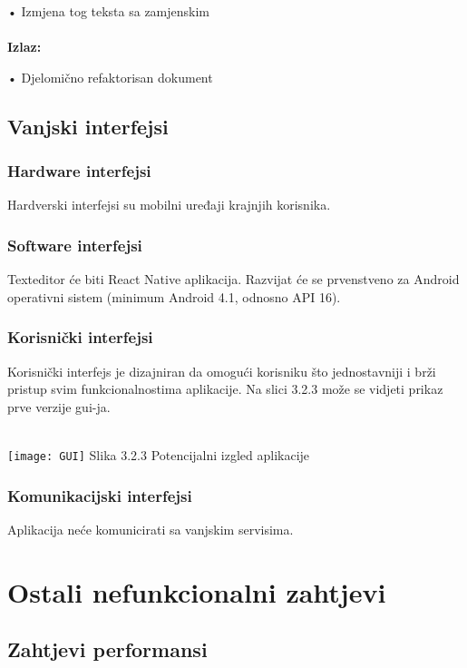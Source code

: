 \documentclass[12pt]{article}
\begin{document}
•	Izmjena tog teksta sa zamjenskim \\ \\
\textbf{Izlaz:}

•	Djelomično refaktorisan dokument
 
\subsection{Vanjski interfejsi}

\subsubsection{Hardware interfejsi}
Hardverski interfejsi su mobilni uređaji krajnjih korisnika.

\subsubsection{Software interfejsi}
Texteditor će biti React Native aplikacija. Razvijat će se prvenstveno za Android operativni sistem (minimum Android 4.1, odnosno API 16).

\subsubsection{Korisnički interfejsi}
Korisnički interfejs je dizajniran da omogući korisniku što jednostavniji i brži pristup svim funkcionalnostima aplikacije. Na slici 3.2.3 može se vidjeti prikaz prve verzije gui-ja. \\ \\

{\centering
\texttt{[image: GUI]} \mbox{} \newline
Slika 3.2.3 Potencijalni izgled aplikacije\par
}

\subsubsection{Komunikacijski interfejsi}
Aplikacija neće komunicirati sa vanjskim servisima.

\section{Ostali nefunkcionalni zahtjevi}
\subsection{Zahtjevi performansi}
\end{document}
